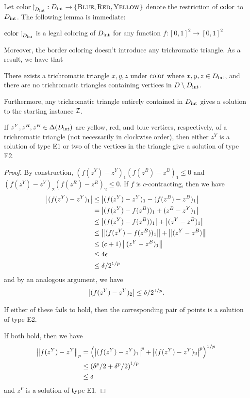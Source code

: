   Let $\operatorname{color}\mathord{\upharpoonright}_{D_{\mathrm{int}}} : D_{\mathrm{int}} \to \left\{ \textsc{Blue}, \textsc{Red}, \textsc{Yellow} \right\}$ denote the restriction of $\operatorname{color}$ to $D_{\mathrm{int}}$. The following lemma is immediate:
  \begin{lemma}
    $\operatorname{color}\mathord{\upharpoonright}_{D_{\mathrm{int}}}$ is a legal coloring of $D_{\mathrm{int}}$ for any function $f: [0,1]^2\to [0,1]^2$
  \end{lemma}

  Moreover, the border coloring doesn't introduce any trichromatic triangle. As a result, we have that
  \begin{lemma}
    There exists a trichromatic triangle $x,y,z$ under $\operatorname{color}$ where $x,y,z\in D_{\mathrm{int}}$, and there are no trichromatic triangles containing vertices in $D\setminus D_{\mathrm{int}}$.
  \end{lemma}

  Furthermore, any trichromatic triangle entirely contained in $D_{\mathrm{int}}$ gives a solution to the starting instance $\mbox{${\mathcal I}$}$.

  \begin{lemma} \label{lemma:TrichromaticTriangles}
    If $z^Y,z^R,z^B \in \Delta(D_{\mathrm{int}})$ are yellow, red, and blue vertices, respectively, of a trichromatic triangle (not necessarily in clockwise order), then either $z^Y$ is a solution of type E1 or two of the vertices in the triangle give a solution of type E2.
  \end{lemma}
  \begin{proof}
    By construction, $(f(z^Y) - z^Y)_1 (f(z^B) - z^B)_1 \leq 0$ and $(f(z^Y) - z^Y)_2 (f(z^R) - z^R)_2 \leq 0$.
    If $f$ is $c$-contracting, then we have 
    \begin{align*}
      \left| (f(z^Y) - z^Y)_1 \right| &\leq \left| (f(z^Y) - z^Y)_1 - (f(z^B) - z^B)_1 \right|\\
                             &= \left| (f(z^Y) - f(z^B))_1 + (z^B - z^Y)_1 \right|\\
                             &\leq \left| (f(z^Y) - f(z^B))_1 \right| + \left| (z^Y - z^B)_1 \right|\\
                             &\leq \left\| (f(z^Y) - f(z^B))_1 \right\| + \left\| (z^Y - z^B) \right\|\\
                             &\leq (c+1)\left\| (z^Y - z^B)_1 \right\|\\
                             &\leq 4\epsilon\\
                             &\leq \delta/2^{1/p}
    \end{align*}  and by an analogous argument, we have
    \[ \left| (f(z^Y) - z^Y)_2 \right| \leq \delta/2^{1/p}\text{.} \]

    If either of these fails to hold, then the corresponding pair of points is a solution of type E2.

    If both hold, then we have
    \begin{align*}
      \left\| f(z^Y) - z^Y \right\|_p &= \left( \left| (f(z^Y) - z^Y)_1 \right|^p + \left| (f(z^Y) - z^Y)_2 \right|^p \right)^{1/p} \\
                          &\leq \left( \delta^p/2 + \delta^p/2 \right)^{1/p}\\
                          &\leq \delta
    \end{align*} and $z^Y$ is a solution of type E1.
  \end{proof}

